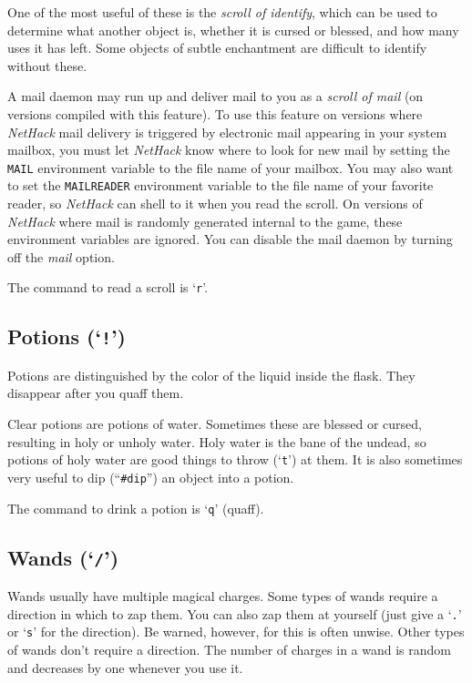 One of the most useful of these is the %
{\it scroll of identify}, which
can be used to determine what another object is, whether it is cursed or
blessed, and how many uses it has left.  Some objects of subtle
enchantment are difficult to identify without these.

A mail daemon may run up and deliver mail to you as a %
{\it scroll of mail} (on versions compiled with this feature).
To use this feature on versions where {\it NetHack\/}
mail delivery is triggered by electronic mail appearing in your system mailbox,
you must let {\it NetHack\/} know where to look for new mail by setting the
{\tt MAIL} environment variable to the file name of your mailbox.
You may also want to set the {\tt MAILREADER} environment variable to the
file name of your favorite reader, so {\it NetHack\/} can shell to it when you
read the scroll.
On versions of {\it NetHack\/} where mail is randomly
generated internal to the game, these environment variables are ignored.
You can disable the mail daemon by turning off the
{\it mail\/} option.

The command to read a scroll is `{\tt r}'.

\subsection*{Potions (`{\tt !}')}

Potions are distinguished by the color of the liquid inside the flask.
They disappear after you quaff them.

Clear potions are potions of water.  Sometimes these are
blessed or cursed, resulting in holy or unholy water.  Holy water is
the bane of the undead, so potions of holy water are good things to
throw (`{\tt t}') at them.  It is also sometimes very useful to dip
(``{\tt \#dip}'') an object into a potion.

The command to drink a potion is `{\tt q}' (quaff).

\subsection*{Wands (`{\tt /}')}

Wands usually have multiple magical charges.
Some types of wands require a direction in which to zap them.
You can also
zap them at yourself (just give a `{\tt .}' or `{\tt s}' for the direction).
Be warned, however, for this is often unwise.
Other types of wands
don't require a direction.  The number of charges in a
wand is random and decreases by one whenever you use it.

